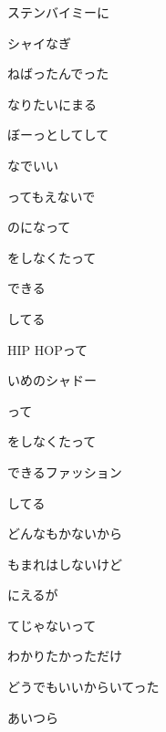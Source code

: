 \documentclass[a4paper,tate,twocolumn,12pt]{ltjtarticle}
\begin{document}
\begin{flushleft}
\begin{minipage}{\linewidth}
ステンバイミーに

シャイなぎ

ねばったんでった

なりたいにまる

ぼーっとしてして

なでいい
\end{minipage}

\vspace{2em}

\noindent\begin{minipage}{\linewidth}
ってもえないで

のになって

をしなくたって

できる

してる

HIP HOPって

いめのシャドー

って

をしなくたって

できるファッション

してる
\end{minipage}

\vspace{2em}

\noindent\begin{minipage}{\linewidth}
どんなもかないから

もまれはしないけど

にえるが

てじゃないって

わかりたかっただけ
\end{minipage}

\vspace{2em}

\noindent\begin{minipage}{\linewidth}
どうでもいいからいてった

あいつら


\end{minipage}
\end{flushleft}
\end{document}
